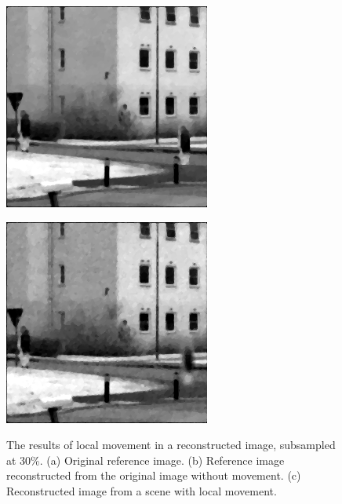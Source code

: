\begin{figure}[H]
\begin{minipage}[t]{0.32\textwidth}
    \includegraphics[width = \textwidth]{result/dynamic/local/local_whole_time_ref.png}
    \subcaption{}
    \label{fig:local_2}
\end{minipage}
\begin{minipage}[t]{0.32\textwidth}
    \includegraphics[width = \textwidth]{result/dynamic/local/local_whole_time_res_psnr_29_snr_25_sssim_91.png}
    \subcaption{}
    \label{fig:local_3}
\end{minipage}
    \caption{The results of local movement in a reconstructed image, subsampled at 30\%. (a) Original reference image. (b) Reference image reconstructed from the original image without movement. (c) Reconstructed image from a scene with local movement.}
    \label{fig:local_dyn}
\end{figure}

